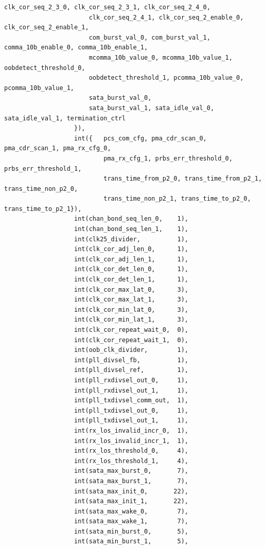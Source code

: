 \begin{lstlisting}[gobble=12, language=threepl]
                       clk_cor_seq_2_3_0, clk_cor_seq_2_3_1, clk_cor_seq_2_4_0,
                       clk_cor_seq_2_4_1, clk_cor_seq_2_enable_0, clk_cor_seq_2_enable_1,
                       com_burst_val_0, com_burst_val_1, comma_10b_enable_0, comma_10b_enable_1,
                       mcomma_10b_value_0, mcomma_10b_value_1, oobdetect_threshold_0,
                       oobdetect_threshold_1, pcomma_10b_value_0, pcomma_10b_value_1,
                       sata_burst_val_0,
                       sata_burst_val_1, sata_idle_val_0, sata_idle_val_1, termination_ctrl
                   }),
                   int({   pcs_com_cfg, pma_cdr_scan_0, pma_cdr_scan_1, pma_rx_cfg_0,
                           pma_rx_cfg_1, prbs_err_threshold_0, prbs_err_threshold_1, 
                           trans_time_from_p2_0, trans_time_from_p2_1, trans_time_non_p2_0,
                           trans_time_non_p2_1, trans_time_to_p2_0, trans_time_to_p2_1}),
                   int(chan_bond_seq_len_0,    1),
                   int(chan_bond_seq_len_1,    1),
                   int(clk25_divider,          1),
                   int(clk_cor_adj_len_0,      1),
                   int(clk_cor_adj_len_1,      1),
                   int(clk_cor_det_len_0,      1),
                   int(clk_cor_det_len_1,      1),
                   int(clk_cor_max_lat_0,      3),
                   int(clk_cor_max_lat_1,      3),
                   int(clk_cor_min_lat_0,      3),
                   int(clk_cor_min_lat_1,      3),
                   int(clk_cor_repeat_wait_0,  0),
                   int(clk_cor_repeat_wait_1,  0),
                   int(oob_clk_divider,        1),
                   int(pll_divsel_fb,          1),
                   int(pll_divsel_ref,         1),
                   int(pll_rxdivsel_out_0,     1),
                   int(pll_rxdivsel_out_1,     1),
                   int(pll_txdivsel_comm_out,  1),
                   int(pll_txdivsel_out_0,     1),
                   int(pll_txdivsel_out_1,     1),
                   int(rx_los_invalid_incr_0,  1),
                   int(rx_los_invalid_incr_1,  1),
                   int(rx_los_threshold_0,     4),
                   int(rx_los_threshold_1,     4),
                   int(sata_max_burst_0,       7),
                   int(sata_max_burst_1,       7),
                   int(sata_max_init_0,       22),
                   int(sata_max_init_1,       22),
                   int(sata_max_wake_0,        7),
                   int(sata_max_wake_1,        7),
                   int(sata_min_burst_0,       5),
                   int(sata_min_burst_1,       5),

\end{lstlisting}
